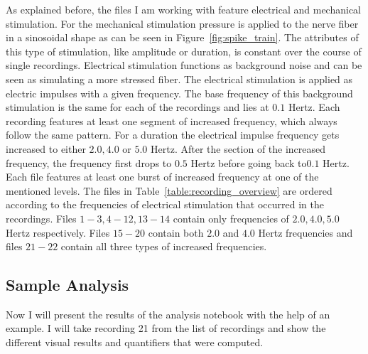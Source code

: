As explained before, the files I am working with feature electrical and mechanical stimulation. For the mechanical stimulation pressure is applied to the nerve fiber in a sinosoidal shape as can be seen in Figure~\ref{fig:spike_train}. The attributes of this type of stimulation, like amplitude or duration, is constant over the course of single recordings. Electrical stimulation functions as background noise and can be seen as simulating a more stressed fiber. The electrical stimulation is applied as electric impulses with a given frequency. The base frequency of this background stimulation is the same for each of the recordings and lies at $0.1$ Hertz. Each recording features at least one segment of increased frequency, which always follow the same pattern. For a duration the electrical impulse frequency gets increased to either $2.0, 4.0$ or $5.0$ Hertz. After the section of the increased frequency, the frequency first drops to $0.5$ Hertz before going back to$0.1$ Hertz.\\
Each file features at least one burst of increased frequency at one of the mentioned levels. The files in Table~\ref{table:recording_overview} are ordered according to the frequencies of electrical stimulation that occurred in the recordings. Files $1-3, 4-12, 13-14$ contain only frequencies of $2.0, 4.0, 5.0$ Hertz respectively. Files $15-20$ contain both $2.0$ and $4.0$ Hertz frequencies and files $21-22$ contain all three types of increased frequencies.\\

\subsection{Sample Analysis}
Now I will present the results of the analysis notebook with the help of an example. I will take recording 21 from the list of recordings and show the different visual results and quantifiers that were computed.

